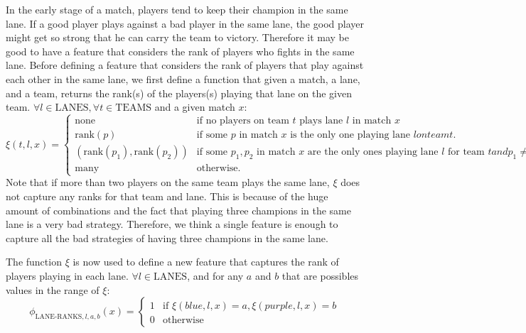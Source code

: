 In the early stage of a match, players tend to keep their champion in the same lane.
If a good player plays against a bad player in the same lane, the good player might get so strong that he can carry the team to victory.
Therefore it may be good to have a feature that considers the rank of players who fights in the same lane.
Before defining a feature that considers the rank of players that play against each other in the same lane,
we first define a function that given a match, a lane, and a team, returns the rank(s) of the players(s) playing that lane on the given team.
$\forall l \in \text{LANES}, \forall t \in \text{TEAMS}$ and a given match $x$:
\begin{equation}\label{eq:xi}
  \xi(t,l,x) =
\begin{cases} 
  \text{none} & \text{if no players on team } t \text{ plays lane } l \text{ in match } x \\
  \text{rank}(p) & \text{if some } p \text{ in match } x \text{ is the only one playing lane } l { on team } t.\\
  (\text{rank}(p_1), \text{rank}(p_2)) & \text{if some } p_1, p_2 \text{ in match } x \text{ are the only ones playing lane } l \text{ for team } t and p_1 \neq p_2.\\
  \text{many} & \text{otherwise}.
\end{cases}
\end{equation}
Note that if more than two players on the same team plays the same lane, $\xi$ does not capture any ranks for that team and lane. This is because of the huge amount of combinations and the fact that playing three champions in the same lane is a very bad strategy. Therefore, we think a single feature is enough to capture all the bad strategies of having three champions in the same lane.
 
The function $\xi$ is now used to define a new feature that captures the rank of players playing in each lane.
$\forall l \in \text{LANES}$, and for any $a$ and $b$ that are possibles values in the range of $\xi$:
\begin{equation}\label{eq:laneranks}
\phi_{\text{LANE-RANKS},l,a,b}(x) =
\begin{cases} 
  1 & \text{if } \xi(\textit{blue},l,x) = a, \xi(\textit{purple},l,x) = b\\
  0 & \text{otherwise} 
\end{cases}  
\end{equation}

